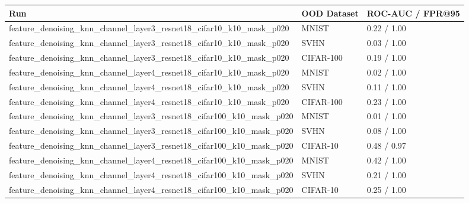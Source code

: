 \begin{tabular}{lll}
\toprule
Run & OOD Dataset & ROC-AUC / FPR@95 \\
\midrule
feature\_denoising\_knn\_channel\_layer3\_resnet18\_cifar10\_k10\_mask\_p020 & MNIST & 0.22 / 1.00 \\
feature\_denoising\_knn\_channel\_layer3\_resnet18\_cifar10\_k10\_mask\_p020 & SVHN & 0.03 / 1.00 \\
feature\_denoising\_knn\_channel\_layer3\_resnet18\_cifar10\_k10\_mask\_p020 & CIFAR-100 & 0.19 / 1.00 \\
feature\_denoising\_knn\_channel\_layer4\_resnet18\_cifar10\_k10\_mask\_p020 & MNIST & 0.02 / 1.00 \\
feature\_denoising\_knn\_channel\_layer4\_resnet18\_cifar10\_k10\_mask\_p020 & SVHN & 0.11 / 1.00 \\
feature\_denoising\_knn\_channel\_layer4\_resnet18\_cifar10\_k10\_mask\_p020 & CIFAR-100 & 0.23 / 1.00 \\
feature\_denoising\_knn\_channel\_layer3\_resnet18\_cifar100\_k10\_mask\_p020 & MNIST & 0.01 / 1.00 \\
feature\_denoising\_knn\_channel\_layer3\_resnet18\_cifar100\_k10\_mask\_p020 & SVHN & 0.08 / 1.00 \\
feature\_denoising\_knn\_channel\_layer3\_resnet18\_cifar100\_k10\_mask\_p020 & CIFAR-10 & 0.48 / 0.97 \\
feature\_denoising\_knn\_channel\_layer4\_resnet18\_cifar100\_k10\_mask\_p020 & MNIST & 0.42 / 1.00 \\
feature\_denoising\_knn\_channel\_layer4\_resnet18\_cifar100\_k10\_mask\_p020 & SVHN & 0.21 / 1.00 \\
feature\_denoising\_knn\_channel\_layer4\_resnet18\_cifar100\_k10\_mask\_p020 & CIFAR-10 & 0.25 / 1.00 \\
\bottomrule
\end{tabular}
